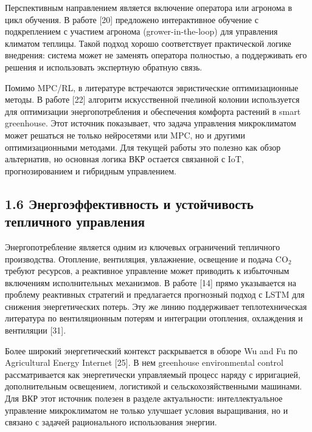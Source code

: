 \documentclass[a4paper,14pt]{extarticle}
\begin{document}
Перспективным направлением является включение оператора или агронома в
цикл обучения. В работе {[}20{]} предложено интерактивное обучение с
подкреплением с участием агронома (grower-in-the-loop) для управления
климатом теплицы. Такой подход хорошо соответствует практической логике
внедрения: система может не заменять оператора полностью, а поддерживать
его решения и использовать экспертную обратную связь.

Помимо MPC/RL, в литературе встречаются эвристические оптимизационные
методы. В работе {[}22{]} алгоритм искусственной пчелиной колонии
используется для оптимизации энергопотребления и обеспечения комфорта
растений в smart greenhouse. Этот источник показывает, что задача
управления микроклиматом может решаться не только нейросетями или MPC,
но и другими оптимизационными методами. Для текущей работы это полезно
как обзор альтернатив, но основная логика ВКР остается связанной с IoT,
прогнозированием и гибридным управлением.

\hypertarget{ux44dux43dux435ux440ux433ux43eux44dux444ux444ux435ux43aux442ux438ux432ux43dux43eux441ux442ux44c-ux438-ux443ux441ux442ux43eux439ux447ux438ux432ux43eux441ux442ux44c-ux442ux435ux43fux43bux438ux447ux43dux43eux433ux43e-ux443ux43fux440ux430ux432ux43bux435ux43dux438ux44f}{%
\subsection{1.6 Энергоэффективность и устойчивость тепличного
управления}\label{ux44dux43dux435ux440ux433ux43eux44dux444ux444ux435ux43aux442ux438ux432ux43dux43eux441ux442ux44c-ux438-ux443ux441ux442ux43eux439ux447ux438ux432ux43eux441ux442ux44c-ux442ux435ux43fux43bux438ux447ux43dux43eux433ux43e-ux443ux43fux440ux430ux432ux43bux435ux43dux438ux44f}}

Энергопотребление является одним из ключевых ограничений тепличного
производства. Отопление, вентиляция, увлажнение, освещение и подача
CO\(_2\) требуют ресурсов, а реактивное управление может приводить к
избыточным включениям исполнительных механизмов. В работе {[}14{]} прямо
указывается на проблему реактивных стратегий и предлагается прогнозный
подход с LSTM для снижения энергетических потерь. Эту же линию
поддерживает теплотехническая литература по вентиляционным потерям и
интеграции отопления, охлаждения и вентиляции {[}31{]}.

Более широкий энергетический контекст раскрывается в обзоре Wu and Fu по
Agricultural Energy Internet {[}25{]}. В нем greenhouse environmental
control рассматривается как энергетически управляемый процесс наряду с
ирригацией, дополнительным освещением, логистикой и
сельскохозяйственными машинами. Для ВКР этот источник полезен в разделе
актуальности: интеллектуальное управление микроклиматом не только
улучшает условия выращивания, но и связано с задачей рационального
использования энергии.
\end{document}
